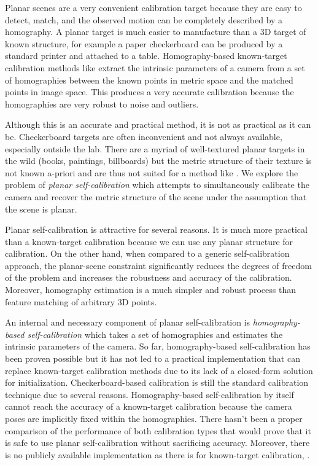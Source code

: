 \documentclass[10pt,twocolumn,letterpaper]{article}
\begin{document}
Planar scenes are a very convenient calibration target because they are easy to detect, match, and the observed motion can be completely described by a homography. A planar target is much easier to manufacture than a 3D target of known structure, for example a paper checkerboard can be produced by a standard printer and attached to a table. Homography-based known-target calibration methods like \cite{sturm1999,zhang1999} extract the intrinsic parameters of a camera from a set of homographies between the known points in metric space and the matched points in image space. This produces a very accurate calibration because the homographies are very robust to noise and outliers. 

Although this is an accurate and practical method, it is not as practical as it can be. Checkerboard targets are often inconvenient and not always available, especially outside the lab. There are a myriad of well-textured planar targets in the wild (books, paintings, billboards) but the metric structure of their texture is not known a-priori and are thus not suited for a method like \cite{zhang1999}. We explore the problem of \emph{planar self-calibration} which attempts to simultaneously calibrate the camera and recover the metric structure of the scene under the assumption that the scene is planar. 

Planar self-calibration is attractive for several reasons. It is much more practical than a known-target calibration because we can use any planar structure for calibration. On the other hand, when compared to a generic self-calibration approach, the planar-scene constraint significantly reduces the degrees of freedom of the problem and increases the robustness and accuracy of the calibration. Moreover, homography estimation is a much simpler and robust process than feature matching of arbitrary 3D points.

An internal and necessary component of planar self-calibration is \emph{homography-based self-calibration} which takes a set of homographies and estimates the intrinsic parameters of the camera. So far, homography-based self-calibration has been proven possible \cite{triggs1998} but it has not led to a practical implementation that can replace known-target calibration methods due to its lack of a closed-form solution for initialization. Checkerboard-based calibration is still the standard calibration technique due to several reasons. Homography-based self-calibration by itself cannot reach the accuracy of a known-target calibration because the camera poses are implicitly fixed within the homographies. There hasn't been a proper comparison of the performance of both calibration types that would prove that it is safe to use planar self-calibration without sacrificing accuracy. Moreover, there is no publicly available implementation as there is for known-target calibration, \eg \cite{bouguetMCT}. 
\end{document}
